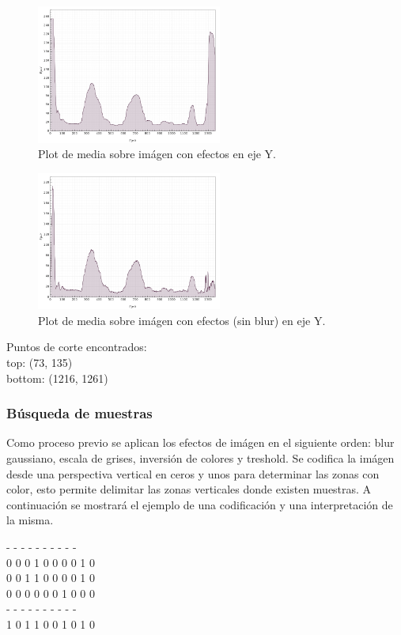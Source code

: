 \begin{figure}[H]
	  \vspace{-0.2cm}
	  \centering
	  \includegraphics[width=230px]{imagenes-jtlc/experimento/search-cut-points/plot-y}
	  \centering
	  \vspace{-0.4cm}
	  \caption{Plot de media sobre im\'agen con efectos en eje Y.}
	  \label{fig:font-sc-plot-y}
	  \vspace{-0.15cm}
\end{figure}
\begin{figure}[H]
	  \vspace{-0.2cm}
	  \centering
	  \includegraphics[width=230px]{imagenes-jtlc/experimento/search-cut-points/plot-y-no-blur}
	  \centering
	  \vspace{-0.4cm}
	  \caption{Plot de media sobre im\'agen con efectos (sin blur) en eje Y.}
	  \label{fig:font-sc-plot-y-s-blur}
	  \vspace{-0.15cm}
\end{figure}
Puntos de corte encontrados:\\
top: (73, 135) \\
bottom: (1216, 1261) \\

\subsubsection{B\'usqueda de muestras}
Como proceso previo se aplican los efectos de im\'agen en el siguiente orden: blur gaussiano, escala de grises, inversi\'on de colores y treshold. Se codifica la im\'agen desde una perspectiva vertical en ceros y unos para determinar las zonas con color, esto permite delimitar las zonas verticales donde existen muestras. A continuaci\'on se mostrar\'a el ejemplo de una codificaci\'on y una interpretaci\'on de la misma.
\newpage
\begin{center}
- - - - - - - - - -\\
0 0 0 1 0 0 0 0 1 0\\
0 0 1 1 0 0 0 0 1 0\\
0 0 0 0 0 0 1 0 0 0\\
- - - - - - - - - -\\
1 0 1 1 0 0 1 0 1 0\\
\end{center}

